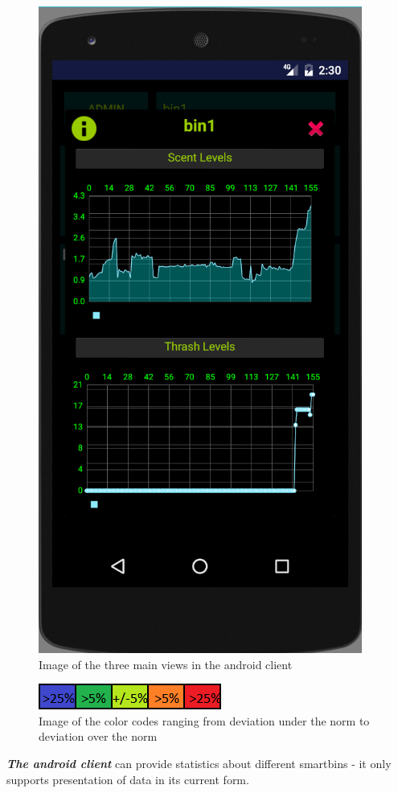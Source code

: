 \begin{figure}
\includegraphics[scale=.3]{img/screen_stats}
\caption{Image of the three main views in the android client} 	
\label{fig:clientmodes}
\end{figure}

\begin{figure}
\centering
\includegraphics{img/app_colors_nb}
\caption{Image of the color codes ranging from deviation under the norm to deviation over the norm} 
\label{fig:colorcodes}
\end{figure}

\textit{\textbf{The android client}} can provide statistics about different smartbins - it only supports  presentation of data in its current form.

